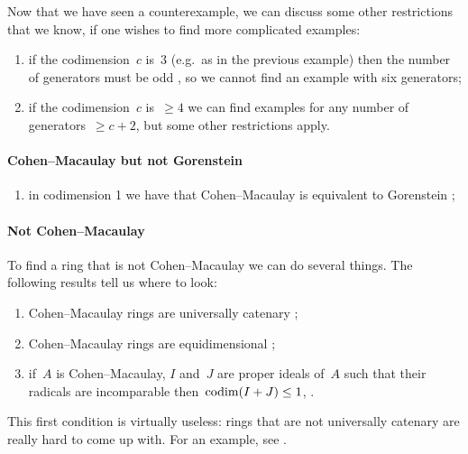 \documentclass[10pt,a4paper]{article}
\begin{document}
\begin{example}
  
\end{example}
Now that we have seen a counterexample, we can discuss some other restrictions that we know, if one wishes to find more complicated examples:
\begin{enumerate}
  \item if the codimension~$c$ is~3 (e.g.\ as in the previous example) then the number of generators must be odd \cite{buchsbaum-eisenbud}, so we cannot find an example with six generators;
  \item if the codimension~$c$ is~$\geq 4$ we can find examples for any number of generators~$\geq c+2$, but some other restrictions apply.
\end{enumerate}

\paragraph{Cohen--Macaulay but not Gorenstein}

\begin{enumerate}
  \item in codimension 1 we have that Cohen--Macaulay is equivalent to Gorenstein \cite[corollary 21.20]{eisenbud-commutative-algebra};
\end{enumerate}

\paragraph{Not Cohen--Macaulay}
To find a ring that is not Cohen--Macaulay we can do several things. The following results tell us where to look:
\begin{enumerate}
  \item Cohen--Macaulay rings are universally catenary \cite[corollary 18.10]{eisenbud-commutative-algebra};
  \item Cohen--Macaulay rings are equidimensional \cite[corollary 18.11]{eisenbud-commutative-algebra};
  \item if~$A$ is Cohen--Macaulay, $I$ and~$J$ are proper ideals of~$A$ such that their radicals are incomparable \expand then~$\operatorname{codim}(I+J)\leq 1$, \cite[theorem 18.12]{eisenbud-commutative-algebra}.
\end{enumerate}
This first condition is virtually useless: rings that are not universally catenary are really hard to come up with. For an example, see .
\end{document}
